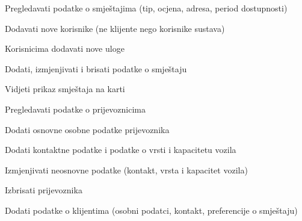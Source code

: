 			
			\begin{packed_enum}
				\item  {}
				
				\begin{packed_enum}
					
					\item Pregledavati podatke o smještajima (tip, ocjena, adresa, period dostupnosti)
					\item Dodavati nove korisnike (ne klijente nego korisnike sustava)
					\item Korisnicima dodavati nove uloge
					\item Dodati, izmjenjivati i brisati podatke o smještaju
					\item Vidjeti prikaz smještaja na karti
					
				\end{packed_enum}
				\eject
				
					\item  {}
				
				\begin{packed_enum}
					
					\item Pregledavati podatke o prijevoznicima
					\item Dodati osnovne osobne podatke prijevoznika
					\item Dodati kontaktne podatke i podatke o vrsti i kapacitetu vozila
					\item Izmjenjivati neosnovne podatke (kontakt, vrsta i kapacitet vozila)
					\item Izbrisati prijevoznika

				\end{packed_enum}
				
					\item  {}
				
				\begin{packed_enum}
					
					\item Dodati podatke o klijentima (osobni podatci, kontakt, preferencije o smještaju)
					
				\end{packed_enum}
			
				\item  {}
				
				\begin{packed_enum}
					

\end{packed_enum}
\end{packed_enum}
